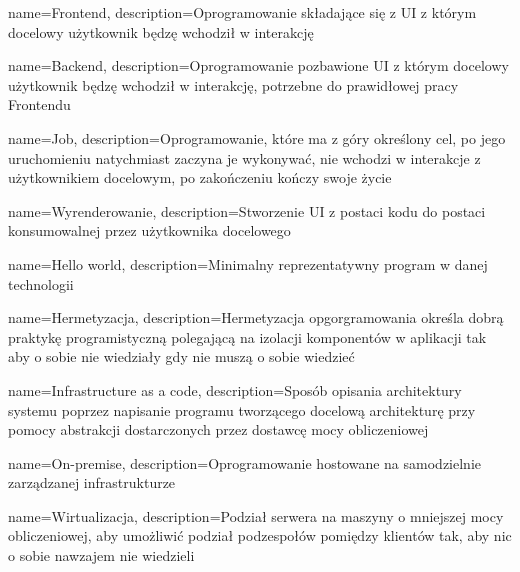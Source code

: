 {
    name={Frontend},
    description={Oprogramowanie składające się z UI z którym docelowy użytkownik będzę wchodził w interakcję}
}

{
    name={Backend},
    description={Oprogramowanie pozbawione UI z którym docelowy użytkownik będzę wchodził w interakcję, potrzebne do prawidłowej pracy Frontendu}
}

{
    name={Job},
    description={Oprogramowanie, które ma z góry określony cel, po jego uruchomieniu natychmiast zaczyna je wykonywać, nie wchodzi w interakcje z użytkownikiem docelowym, po zakończeniu kończy swoje życie}
}


{
    name={Wyrenderowanie},
    description={Stworzenie UI z postaci kodu do postaci konsumowalnej przez użytkownika docelowego}
}

{
    name={Hello world},
    description={Minimalny reprezentatywny program w danej technologii}
}

{
    name={Hermetyzacja},
    description={Hermetyzacja opgorgramowania określa dobrą praktykę programistyczną polegającą na izolacji komponentów w aplikacji tak aby o sobie nie wiedziały gdy nie muszą o sobie wiedzieć}
}

{
    name={Infrastructure as a code},
    description={Sposób opisania architektury systemu poprzez napisanie programu tworzącego docelową architekturę przy pomocy abstrakcji dostarczonych przez dostawcę mocy obliczeniowej}
}

{
    name={On-premise},
    description={Oprogramowanie hostowane na samodzielnie zarządzanej infrastrukturze}
}

{
    name={Wirtualizacja},
    description={Podział serwera na maszyny o mniejszej mocy obliczeniowej, aby umożliwić podział podzespołów pomiędzy klientów tak, aby nic o sobie nawzajem nie wiedzieli}
}

